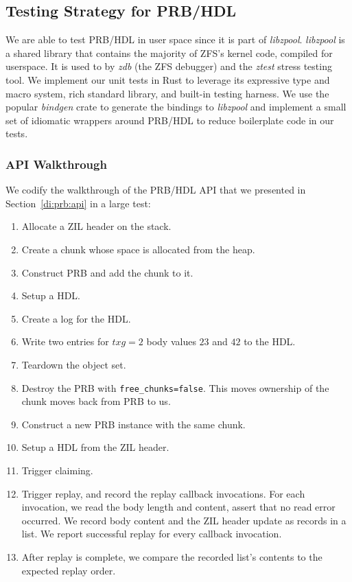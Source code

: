 \documentclass[12pt,a4paper,twoside]{book}
\begin{document}
\subsection{Testing Strategy for PRB/HDL}\label{sec:eval:correctness:prb}

We are able to test PRB/HDL in user space since it is part of \textit{libzpool}.
\textit{libzpool} is a shared library that contains the majority of ZFS's kernel code, compiled for userspace.
It is used to by \textit{zdb} (the ZFS debugger) and the \textit{ztest} stress testing tool.
We implement our unit tests in Rust to leverage its expressive type and macro system, rich standard library, and built-in testing harness.
We use the popular \textit{bindgen} crate to generate the bindings to \textit{libzpool} and implement a small set of idiomatic wrappers around PRB/HDL to reduce boilerplate code in our tests.

\subsubsection{API Walkthrough}
We codify the walkthrough of the PRB/HDL API that we presented in Section~\ref{di:prb:api} in a large test:
\begin{enumerate}[noitemsep]
    \item Allocate a ZIL header on the stack.
    \item Create a chunk whose space is allocated from the heap.
    \item Construct PRB and add the chunk to it.
    \item Setup a HDL.
    \item Create a log for the HDL.
    \item Write two entries for $txg=2$ body values $23$ and $42$ to the HDL.
    \item Teardown the object set.
    \item Destroy the PRB with \lstinline{free_chunks=false}. This moves ownership of the chunk moves back from PRB to us.
    \item Construct a new PRB instance with the same chunk.
    \item Setup a HDL from the ZIL header.
    \item Trigger claiming.
    \item Trigger replay, and record the replay callback invocations.
        For each invocation, we read the body length and content, assert that no read error occurred.
        We record body content and the ZIL header update as records in a list.
        We report successful replay for every callback invocation.
    \item After replay is complete, we compare the recorded list's contents to the expected replay order.
\end{enumerate}
\end{document}
